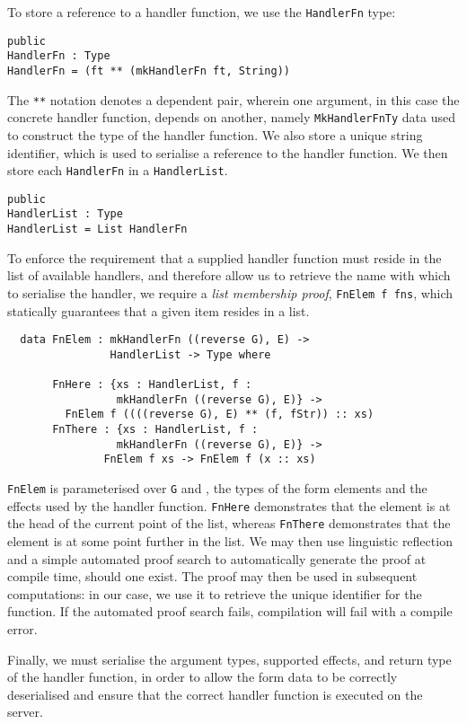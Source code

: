 \documentclass[preprint]{sigplanconf}
\begin{document}
To store a reference to a handler function, we use the \texttt{HandlerFn} type:
\begin{verbatim}
public
HandlerFn : Type
HandlerFn = (ft ** (mkHandlerFn ft, String))
\end{verbatim}
%
The \texttt{**} notation denotes a dependent pair, wherein one argument, in this case the concrete handler function, depends on another, namely \texttt{MkHandlerFnTy} data used to construct the type of the handler function. We also store a unique string identifier, which is used to serialise a reference to the handler function. We then store each \texttt{HandlerFn} in a \texttt{HandlerList}.

\begin{verbatim}
public
HandlerList : Type
HandlerList = List HandlerFn
\end{verbatim}
To enforce the requirement that a supplied handler function must reside in the list of available handlers, and therefore allow us to retrieve the name with which to serialise the handler, we require a \textit{list membership proof},  \texttt{FnElem f fns}, which statically guarantees that a given item resides in a list.
{\small
\begin{verbatim}
  data FnElem : mkHandlerFn ((reverse G), E) -> 
                HandlerList -> Type where
                
       FnHere : {xs : HandlerList, f : 
                 mkHandlerFn ((reverse G), E)} ->
         FnElem f ((((reverse G), E) ** (f, fStr)) :: xs)
       FnThere : {xs : HandlerList, f : 
                 mkHandlerFn ((reverse G), E)} ->
               FnElem f xs -> FnElem f (x :: xs)
\end{verbatim}
}
\texttt{FnElem} is parameterised over \texttt{G} and , the types of the form elements and the effects used by the handler function. \texttt{FnHere} demonstrates that the element is at the head of the current point of the list, whereas \texttt{FnThere} demonstrates that the element is at some point further in the list. %
We may then use linguistic reflection and a simple automated proof search to automatically generate the proof at compile time, should one exist. The proof may then be used in subsequent computations: in our case, we use it to retrieve the unique identifier for the function. If the automated proof search fails, compilation will fail with a compile error.

Finally, we must serialise the argument types, supported effects, and return type of the handler function, in order to allow the form data to be correctly deserialised and ensure that the correct handler function is executed on the server. 
\end{document}
